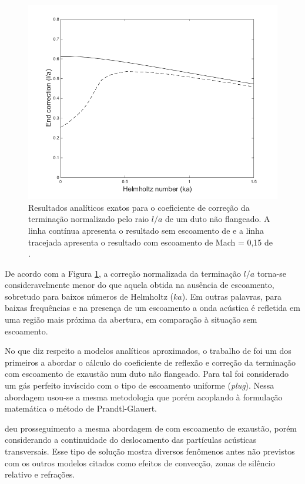 \begin{figure}[ht!]
\centering
  \includegraphics[width=.9\linewidth]{figuras/loa_comparacao.png}
  \caption[Coeficientes de correção de terminação $l/a$]{Resultados analíticos exatos para o coeficiente de correção da terminação normalizado pelo raio $l/a$ de um duto não flangeado. A linha contínua apresenta o resultado sem escoamento de  e a linha tracejada apresenta o resultado com escoamento de Mach = 0,15 de .}
  \label{fig:comp2}
\end{figure}
\newpage
De acordo com a Figura \ref{fig:comp2}, a correção normalizada da terminação $l/a$ torna-se consideravelmente menor do que aquela obtida na ausência de escoamento, sobretudo para baixos números de Helmholtz ($ka$). Em outras palavras, para baixas frequências e na presença de um escoamento a onda acústica é refletida em uma região mais próxima da abertura, em comparação à situação sem escoamento.

No que diz respeito a modelos analíticos aproximados, o trabalho de  foi um dos primeiros a abordar o cálculo do coeficiente de reflexão e correção da terminação com escoamento de exaustão num duto não flangeado. Para tal foi considerado um gás perfeito invíscido com o tipo de escoamento uniforme (\textit{plug}). Nessa abordagem usou-se a mesma metodologia que  porém acoplando à formulação matemática o método de Prandtl-Glauert.

 deu prosseguimento a mesma abordagem de  com escoamento de exaustão, porém considerando a continuidade do deslocamento das partículas acústicas transversais. Esse tipo de solução mostra diversos fenômenos antes não previstos com os outros modelos citados como efeitos de convecção, zonas de silêncio relativo e refrações.

